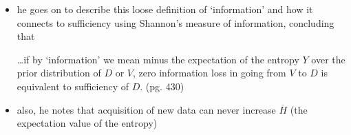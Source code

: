 \documentclass[../jaynes_prob_theory_notes.tex]{subfiles}
\begin{document}
\begin{itemize}
                \item he goes on to describe this loose definition of `information' and how it connects to sufficiency using Shannon's measure of information, concluding that
                    \begin{displayquote}
                        \ldots if by `information' we mean minus the expectation of the entropy \(Y\) over the prior distribution of \(D\) or \(V\), zero information loss in going from \(V\) to \(D\) is equivalent to sufficiency of \(D\). (pg. 430)
                    \end{displayquote}
                \item also, he notes that acquisition of new data can never increase \(\overline{H}\) (the expectation value of the entropy)
            \end{itemize}
        
\end{document}
